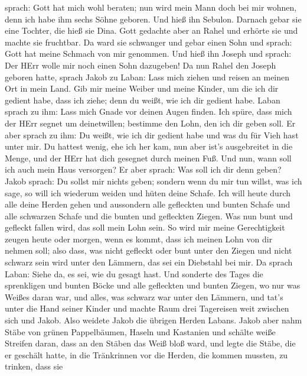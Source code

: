 sprach: Gott hat mich wohl beraten; nun wird mein Mann doch bei mir
wohnen, denn ich habe ihm sechs Söhne geboren. Und hieß ihn Sebulon.
 Darnach gebar sie eine Tochter, die hieß sie Dina.
 Gott gedachte aber an Rahel und erhörte sie und machte sie
fruchtbar.  Da ward sie schwanger und gebar einen Sohn und
sprach: Gott hat meine Schmach von mir genommen.  Und hieß
ihn Joseph und sprach: Der HErr wolle mir noch einen Sohn dazugeben!
 Da nun Rahel den Joseph geboren hatte, sprach Jakob zu
Laban: Lass mich ziehen und reisen an meinen Ort in mein Land.
 Gib mir meine Weiber und meine Kinder, um die ich dir
gedient habe, dass ich ziehe; denn du weißt, wie ich dir gedient habe.
 Laban sprach zu ihm: Lass mich Gnade vor deinen Augen
finden. Ich spüre, dass mich der HErr segnet um deinetwillen;
 bestimme den Lohn, den ich dir geben soll. 
Er aber sprach zu ihm: Du weißt, wie ich dir gedient habe und was du für
Vieh hast unter mir.  Du hattest wenig, ehe ich her kam,
nun aber ist's ausgebreitet in die Menge, und der HErr hat dich gesegnet
durch meinen Fuß. Und nun, wann soll ich auch mein Haus versorgen?
 Er aber sprach: Was soll ich dir denn geben? Jakob sprach:
Du sollst mir nichts geben; sondern wenn du mir tun willst, was ich
sage, so will ich wiederum weiden und hüten deine Schafe. 
Ich will heute durch alle deine Herden gehen und aussondern alle
gefleckten und bunten Schafe und alle schwarzen Schafe und die bunten
und gefleckten Ziegen. Was nun bunt und gefleckt fallen wird, das soll
mein Lohn sein.  So wird mir meine Gerechtigkeit zeugen
heute oder morgen, wenn es kommt, dass ich meinen Lohn von dir nehmen
soll; also dass, was nicht gefleckt oder bunt unter den Ziegen und nicht
schwarz sein wird unter den Lämmern, das sei ein Diebstahl bei mir.
 Da sprach Laban: Siehe da, es sei, wie du gesagt hast.
 Und sonderte des Tages die sprenkligen und bunten Böcke
und alle gefleckten und bunten Ziegen, wo nur was Weißes daran war, und
alles, was schwarz war unter den Lämmern, und tat's unter die Hand
seiner Kinder  und machte Raum drei Tagereisen weit
zwischen sich und Jakob. Also weidete Jakob die übrigen Herden Labans.
 Jakob aber nahm Stäbe von grünen Pappelbäumen, Haseln und
Kastanien und schälte weiße Streifen daran, dass an den Stäben das Weiß
bloß ward,  und legte die Stäbe, die er geschält hatte, in
die Tränkrinnen vor die Herden, die kommen mussten, zu trinken, dass sie
